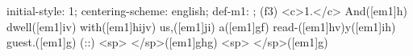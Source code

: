 initial-style: 1;
centering-scheme: english;
def-m1: \grealign;
(f3) <c>1.</c> And([em1]h) dwell([em1]iv) with([em1]hijv) us,([em1]ji) a([em1]gf) read-([em1]hv)y([em1]ih) guest.([em1]g) (::) <sp> </sp>([em1]ghg) <sp>   </sp>([em1]g)